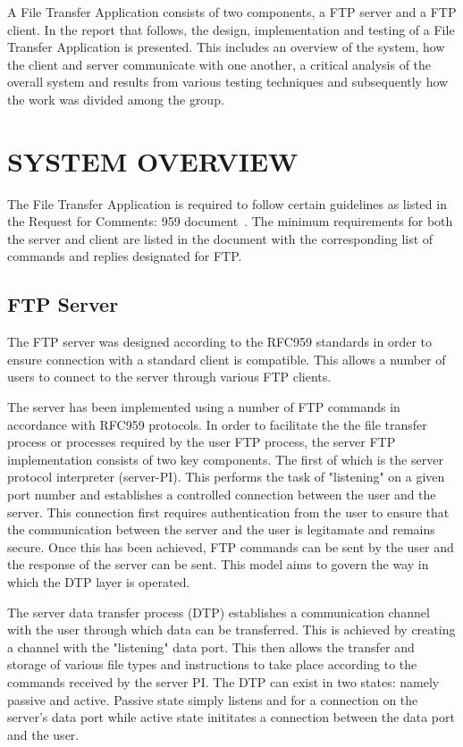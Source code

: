 \documentclass[10pt,twocolumn]{witseiepaper}
\begin{document}
A File Transfer Application consists of two components, a FTP server and a FTP client. In the report that follows, the design, implementation and testing of a File Transfer Application is presented. This includes an overview of the system, how the client and server communicate with one another, a critical analysis of the overall system and results from various testing techniques and subsequently how the work was divided among the group.


%
\section{SYSTEM OVERVIEW}
\label{sec: System Overview}
The File Transfer Application is required to follow certain guidelines as listed in the Request for Comments: 959 document~\cite{RFC959}. The minimum requirements for both the server and client are listed in the document with the corresponding list of commands and replies designated for FTP.

\subsection{FTP Server}
\label{sec: FTP Server}
The FTP server was designed according to the RFC959 standards in order to ensure connection with a standard client is compatible. This allows a number of users to connect to the server through various FTP clients.

The server has been implemented using a number of FTP commands in accordance with RFC959 protocols. In order to facilitate the the file transfer process or processes required by the user FTP process, the server FTP implementation consists of two key components. The first of which is the server protocol interpreter (server-PI). This performs the task of "listening" on a given port number and establishes a controlled connection between the user and the server. This connection first requires authentication from the user to ensure that the communication between the server and the user is legitamate and remains secure. Once this has been achieved, FTP commands can be sent by the user and the response of the server can be sent. This model aims to govern the way in which the DTP layer is operated.

The server data transfer process (DTP) establishes a communication channel with the user through which data can be transferred. This is achieved by creating a channel with the "listening" data port. This then allows the transfer and storage of various file types and instructions to take place according to the commands received by the server PI. The DTP can exist in two states: namely passive and active. Passive state simply listens and for a connection on the server's data port while active state inititates a connection between the data port and the user.
\end{document}
